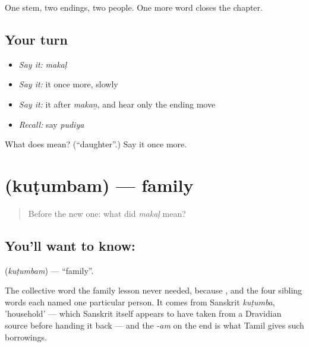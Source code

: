 \begin{grammarlens}[title={What you've built}]
One stem, two endings, two people. One more word closes the chapter.
\end{grammarlens}

\subsection*{Your turn}
\begin{itemize}
\raggedright
  \item \emph{Say it:} \emph{makaḷ}
  \item \emph{Say it:} it once more, slowly
  \item \emph{Say it:} it after \emph{makaṉ}, and hear only the ending move
  \item \emph{Recall:} say \emph{pudiya}
\end{itemize}

\begin{tcolorbox}[breakable,colback=teal!4,colframe=teal!35!black,title={Before you move on}]
What does  mean? (\textquotedblleft{}daughter\textquotedblright{}.) Say it once more.
\end{tcolorbox}
\section[\texorpdfstring{\ta{குடும்பம்} (kuṭumbam)}{குடும்பம் (kuṭumbam)}]{ (kuṭumbam) — family}

\label{lesson:TA-C43-family}



\begin{quote}
Before the new one: what did \emph{makaḷ} mean?
\end{quote}

\subsection*{You'll want to know: }
\textbf{} (\emph{kuṭumbam}) — \textquotedblleft{}family\textquotedblright{}.

The collective word the family lesson never needed, because ,  and the four sibling words each named one particular person. It comes from Sanskrit \emph{kuṭumba}, 'household' — which Sanskrit itself appears to have taken from a Dravidian source before handing it back — and the \emph{-am} on the end is what Tamil gives such borrowings.

